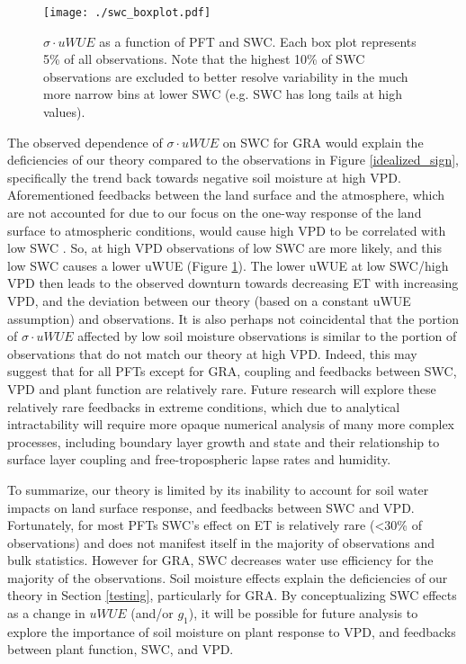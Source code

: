 \documentclass[draft,linenumbers]{afmjournal}
\begin{document}
\begin{figure}
  \centering
  \centerline{\texttt{[image: ./swc\_boxplot.pdf]}}
  \caption{$\sigma \cdot uWUE$ as a function of PFT and SWC. Each box
    plot represents 5\% of all observations. Note that the highest
    10\% of SWC observations are excluded to better resolve variability in the much more narrow bins at lower SWC (e.g. SWC has long tails at high values).}
  \label{swc_boxplot}
\end{figure}

The observed dependence of $\sigma \cdot uWUE$ on SWC for GRA would
explain the deficiencies of our theory compared to the observations in
Figure \ref{idealized_sign}, specifically the trend back towards
negative soil moisture at high VPD. Aforementioned feedbacks between
the land surface and the atmosphere, which are not accounted for due
to our focus on the one-way response of the land surface to
atmospheric conditions, would cause high VPD to be correlated with low
SWC \citep[][]{Gentine_2016, Berg_2016}. So, at high VPD observations
of low SWC are more likely, and this low SWC causes a lower uWUE
(Figure \ref{swc_boxplot}). The lower uWUE at low SWC/high VPD then
leads to the observed downturn towards decreasing ET with increasing
VPD, and the deviation between our theory (based on a constant uWUE
assumption) and observations. It is also perhaps not coincidental that
the portion of $\sigma \cdot uWUE$ affected by low soil moisture
observations is similar to the portion of observations that do not
match our theory at high VPD. Indeed, this may suggest that for all PFTs
except for GRA, coupling and feedbacks between SWC, VPD and plant
function are relatively rare. Future research will explore these relatively rare feedbacks in extreme conditions, which due to analytical intractability will require more opaque numerical analysis of many more complex processes, including boundary layer growth and state and their relationship to surface layer coupling and free-tropospheric lapse rates and humidity.

To summarize, our theory is limited by its inability to account for
soil water impacts on land surface response, and feedbacks between SWC
and VPD. Fortunately, for most PFTs SWC's effect on ET is relatively
rare (<30\% of observations) and does not manifest itself in the
majority of observations and bulk statistics. However for GRA, SWC decreases water use efficiency for the majority of
the observations. Soil moisture effects explain the deficiencies of
our theory in Section \ref{testing}, particularly for GRA. By
conceptualizing SWC effects as a change in $uWUE$ (and/or $g_1$), it
will be possible for future analysis to explore the importance of soil
moisture on plant response to VPD, and feedbacks between plant
function, SWC, and VPD.
\end{document}
